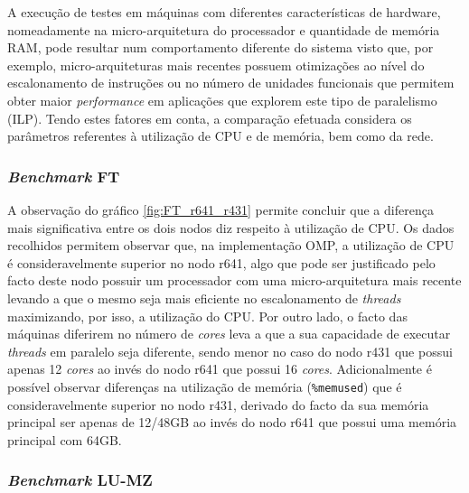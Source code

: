 \documentclass{article}
\begin{document}
\quad A execução de testes em máquinas com diferentes características de hardware, nomeadamente na micro-arquitetura do processador e 
quantidade de memória RAM, pode resultar num comportamento diferente do sistema visto que, por exemplo, micro-arquiteturas mais recentes 
possuem otimizações ao nível do escalonamento de instruções ou no número de unidades funcionais que permitem obter maior \textit{performance} em
aplicações que explorem este tipo de paralelismo (ILP). Tendo estes fatores em conta, a comparação efetuada considera os parâmetros referentes à
utilização de CPU e de memória, bem como da rede.


\subsubsection{\textit{Benchmark} FT}

\quad A observação do gráfico \ref{fig:FT_r641_r431} permite concluir que a diferença mais significativa entre os dois nodos diz respeito à utilização de CPU. 
Os dados recolhidos permitem observar que, na implementação OMP, a utilização de CPU é consideravelmente superior no nodo r641, algo que pode ser justificado
pelo facto deste nodo possuir um processador com uma micro-arquitetura mais recente levando a que o mesmo seja mais eficiente no escalonamento de \textit{threads}
maximizando, por isso, a utilização do CPU. Por outro lado, o facto das máquinas diferirem no número de \textit{cores} leva a que a sua capacidade de executar
\textit{threads} em paralelo seja diferente, sendo menor no caso do nodo r431 que possui apenas 12 \textit{cores} ao invés do nodo r641 que possui 16 \textit{cores}.
Adicionalmente é possível observar diferenças na utilização de memória (\texttt{\%memused}) que é consideravelmente superior no nodo r431, derivado do
facto da sua memória principal ser apenas de 12/48GB ao invés do nodo r641 que possui uma memória principal com 64GB.


\subsubsection{\textit{Benchmark} LU-MZ}
\end{document}

